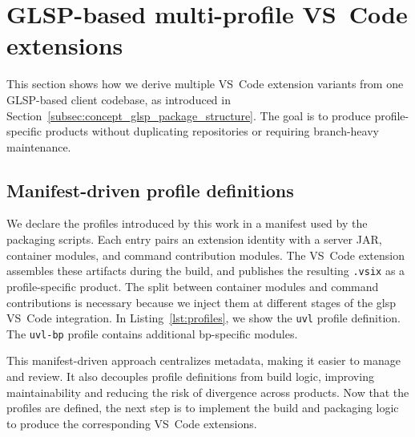 \section{GLSP-based multi-profile VS~Code extensions}
\label{sec:impl_multi_profile}

This section shows how we derive multiple VS~Code extension variants from one GLSP-based client codebase, as introduced in Section~\ref{subsec:concept_glsp_package_structure}.
The goal is to produce profile-specific products without duplicating repositories or requiring branch-heavy maintenance.

\subsection{Manifest-driven profile definitions}
\label{subsec:impl_multi_profile_manifest}



We declare the profiles introduced by this work in a manifest used by the packaging scripts.
Each entry pairs an extension identity with a server JAR, container modules, and command contribution modules.
The VS~Code extension assembles these artifacts during the build, and publishes the resulting \texttt{.vsix} as a profile-specific product.
The split between container modules and command contributions is necessary because we inject them at different stages of the \gls{glsp} VS~Code integration.
In Listing~\ref{lst:profiles}, we show the \texttt{uvl} profile definition.
The \texttt{uvl-bp} profile contains additional \gls{bp}-specific modules.



This manifest-driven approach centralizes metadata, making it easier to manage and review.
It also decouples profile definitions from build logic, improving maintainability and reducing the risk of divergence across products.
Now that the profiles are defined, the next step is to implement the build and packaging logic to produce the corresponding VS~Code extensions.

